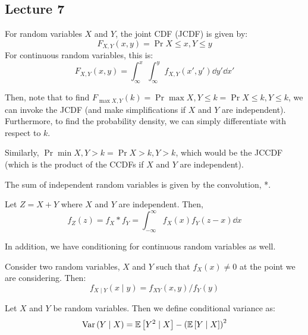 \subsection{Lecture 7}

\begin{definition} [JCDF]
    For random variables $X$ and $Y$, the joint CDF (JCDF) is given by:
    \[ F_{X, Y}(x, y) = \Pr{X \leq x, Y \leq y} \] 
    For continuous random variables, this is:
    \[ F_{X,Y}(x, y) = \int_{\infty}^x \int_{\infty}^y f_{X, Y}(x', y') \dd{y'} \dd{x'} \]
\end{definition}

Then, note that to find $F_{\max{X, Y}}(k) = \Pr{\max{X, Y} \leq k} = \Pr{X \leq k, Y \leq k}$, we can invoke the JCDF (and make simplifications if $X$ and $Y$ are independent).
Furthermore, to find the probability density, we can simply differentiate with respect to $k$.

Similarly, $\Pr{\min{X, Y} > k} = \Pr{X > k, Y > k}$, which would be the JCCDF (which is the product of the CCDFs if $X$ and $Y$ are independent).

The sum of independent random variables is given by the convolution, *.
\begin{theorem} [Convolution]
    Let $Z = X + Y$ where $X$ and $Y$ are independent. Then,
    \[ f_Z(z) = f_X * f_Y = \int_{-\infty}^{\infty} f_X(x) f_Y(z - x) \dd{x} \]
\end{theorem}

In addition, we have conditioning for continuous random variables as well.
\begin{definition}
    Consider two random variables, $X$ and $Y$ such that $f_X(x) \neq 0$ at the point we are considering. Then:
    \[ f_{X \mid Y}(x \mid y) = f_{XY}(x, y)/f_{Y}(y) \]
\end{definition}

\begin{definition}
    Let $X$ and $Y$ be random variables. Then we define conditional variance as:
    \[ \text{Var}\left( Y \mid X \right) = \mathbb{E}\left[ Y^2 \mid X \right] - \qty(\mathbb{E}\left[ Y \mid X \right])^2 \]
\end{definition}

